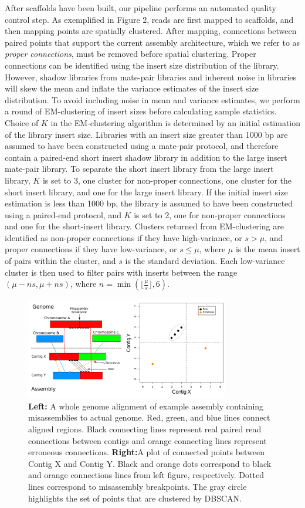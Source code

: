 \documentclass{bioinfo}
\begin{document}
After scaffolds have been built, our pipeline performs an automated quality control step.
As exemplified in Figure 2, reads are first mapped to scaffolds, and then mapping points are spatially clustered.
After mapping, connections between paired points that support the current assembly architecture, which we 
refer to as \emph{proper connections}, must be removed before spatial clustering. Proper connections
can be identified using the insert size distribution of the library. However, shadow libraries from 
mate-pair libraries and inherent noise in libraries will skew the mean and inflate the variance 
estimates of the insert size distribution. To avoid including noise in mean and variance estimates, 
we perform a round of EM-clustering of insert sizes before calculating sample statistics. Choice of $K$ in
the EM-clustering algorithm is determined by an initial estimation of the library insert size. Libraries with an 
insert size greater than 1000 bp are assumed to have been constructed using a mate-pair protocol, and therefore
contain a paired-end short insert shadow library in addition to the large insert mate-pair library. To separate the short insert library
from the large insert library, $K$ is set to 3, one cluster for non-proper connections, one cluster for the short insert
library, and one for the large insert library. If the initial insert size estimation is less than 1000 bp, the library
is assumed to have been constructed using a paired-end protocol, and $K$ is set to 2, one for non-proper connections
and one for the short-insert library. Clusters returned from EM-clustering are identified as non-proper connections if 
they have high-variance, or $s > \mu$, and proper connections if they have low-variance, or $s \le \mu$, where $\mu$ is the mean insert of pairs within
the cluster, and $s$ is the standard deviation. Each low-variance cluster is then used to filter 
pairs with inserts between the range $(\mu-ns,\mu+ns)$, where $n = \min(\lfloor\frac{\mu}{s}\rfloor, 6)$.  


\begin{figure}[t]
\includegraphics[width=3.5in]{fish-qc.pdf}
\vspace{-1cm}
\caption{\textbf{Left:}  A whole genome alignment of example assembly containing misassemblies to actual genome. 
Red, green, and blue lines connect aligned regions. Black connecting lines represent real paired read 
connections between contigs and orange connecting lines represent erroneous connections. \textbf{Right:}A plot 
of connected points between Contig X and Contig Y. Black and orange dots correspond
to black and orange connections lines from left figure, respectively. Dotted lines correspond
to misassembly breakpoints. The gray circle highlights the set of points that are clustered by DBSCAN. }\label{fig:02}
\end{figure}
\end{document}
